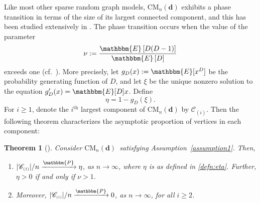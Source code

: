 \documentclass[11pt,a4paper, reqno]{article}
\numberwithin{equation}{section}
\numberwithin{equation}{section}
\def\sss{\scriptscriptstyle}
\newcommand{\expt}[1]{\ensuremath{\mathbbm{E}\left[#1\right]}}
\newcommand{\pto}{\ensuremath{\xrightarrow{\mathbbm{P}}}}
\newcommand{\E}{\ensuremath{\mathbbm{E}}}
\newcommand{\1}{\ensuremath{\mathbbm{1}}}
\newcommand{\CM}{\ensuremath{\mathrm{CM}_n(\boldsymbol{d})}}
\newcommand{\supth}{\mathrm{th}}
\newtheorem{theorem}{Theorem}
\numberwithin{equation}{section}
\numberwithin{theorem}{section}
\begin{document}
Like most other sparse random graph models, $\CM$ exhibits a phase transition in terms of the size of its largest connected component, and this has been studied extensively in \cite{MR95,JL09}. 
The phase transition occurs when the value of the parameter 
\begin{equation}
 \nu : = \frac{\expt{D(D-1)}}{\expt{D}} \label{eq:nu}
\end{equation}
exceeds one (cf.~\cite{JL09}).
More precisely, let $g_D(x):=\E[x^D]$ be the probability generating function of $D$, and let $\xi$ be the unique nonzero solution to the equation $g_D'(x)=\E[D] x$. Define
\begin{equation}\label{defn:eta}
\eta=1-g_D(\xi).
\end{equation}  
For  $i\geq 1$, denote the $i^{\supth}$ largest component of $\CM$ by $\mathscr{C}_{\sss (i)}$. 
Then the following theorem characterizes the asymptotic proportion of vertices in each component:
\begin{theorem}[{\cite[Theorem 2.3]{JL09}}]\label{thm:JL09}
Consider \CM\ satisfying {\rm Assumption~\ref{assumption1}}. Then, 
\begin{enumerate}[{\normalfont (i)}]
 \item $|\mathscr{C}_{\sss (1)}|/n\pto \eta$, as $n\to\infty$, where $\eta$ is as defined in \eqref{defn:eta}. 
 Further, $\eta >0$ if and only if $\nu>1.$
 \item Moreover, $|\mathscr{C}_{\sss (i)}|/n\pto 0$, as $n\to\infty$, for all $i\geq 2$.
\end{enumerate}
\end{theorem}
\end{document}
